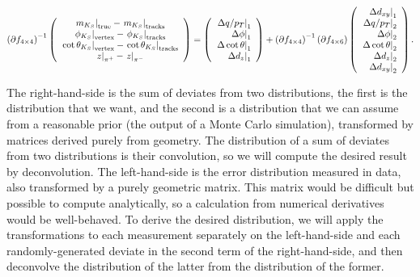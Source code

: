 \documentclass[12pt]{article}
\begin{document}
\begin{equation}
\left(\partial f_{4\times 4}\right)^{-1}
\left(\begin{array}{c}
\left.m_{K_S}\right|_{\mbox{\scriptsize true}} - \left.m_{K_S}\right|_{\mbox{\scriptsize tracks}} \\
\left.\phi_{K_S}\right|_{\mbox{\scriptsize vertex}} - \left.\phi_{K_S}\right|_{\mbox{\scriptsize tracks}} \\
\left.\cot\theta_{K_S}\right|_{\mbox{\scriptsize vertex}} - \left.\cot\theta_{K_S}\right|_{\mbox{\scriptsize tracks}} \\
\left.z\right|_{\pi^+} - \left.z\right|_{\pi^-} \\
\end{array}\right) =
\left(\begin{array}{r}
\left.\Delta q/p_T\right|_1 \\
\left.\Delta \phi\right|_1 \\
\left.\Delta \cot\theta\right|_1 \\
\left.\Delta d_z\right|_1 \\
\end{array}\right) + 
\left(\partial f_{4\times 4}\right)^{-1}
\left(\partial f_{4\times 6}\right)
\left(\begin{array}{r}
\left.\Delta d_{xy}\right|_1 \\
\left.\Delta q/p_T\right|_2 \\
\left.\Delta \phi\right|_2 \\
\left.\Delta \cot\theta\right|_2 \\
\left.\Delta d_z\right|_2 \\
\left.\Delta d_{xy}\right|_2 \\
\end{array}\right)\mbox{.}
\label{eqn:twoterms}
\end{equation}

The right-hand-side is the sum of deviates from two distributions, the
first is the distribution that we want, and the second is a
distribution that we can assume from a reasonable prior (the output of
a Monte Carlo simulation), transformed by matrices derived purely from
geometry.  The distribution of a sum of deviates from two
distributions is their convolution, so we will compute the desired
result by deconvolution.  The left-hand-side is the error distribution
measured in data, also transformed by a purely geometric matrix.  This
matrix would be difficult but possible to compute analytically, so a
calculation from numerical derivatives would be well-behaved.  To
derive the desired distribution, we will apply the transformations to
each measurement separately on the left-hand-side and each
randomly-generated deviate in the second term of the right-hand-side,
and then deconvolve the distribution of the latter from the
distribution of the former.
\end{document}
